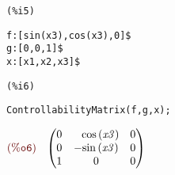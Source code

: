 \noindent
\begin{minipage}[t]{8ex}\color{red}\bf
\begin{verbatim}
(%i5) 
\end{verbatim}
\end{minipage}
\begin{minipage}[t]{\textwidth}\color{blue}
\begin{verbatim}
f:[sin(x3),cos(x3),0]$
g:[0,0,1]$
x:[x1,x2,x3]$
\end{verbatim}
\end{minipage}

\smallskip

\noindent
\begin{minipage}[t]{8ex}\color{red}\bf
\begin{verbatim}
(%i6) 
\end{verbatim}
\end{minipage}
\begin{minipage}[t]{\textwidth}\color{blue}
\begin{verbatim}
ControllabilityMatrix(f,g,x);
\end{verbatim}
\end{minipage}

\noindent
\begin{math}\displaystyle
\parbox{8ex}{$\color{labelcolor}\mathrm{\tt (\%o6) }\quad $}
\begin{pmatrix}0 & \phantom{-}\mathrm{cos}\left( \mathit{x3}\right)  & 0\cr 0 & -\mathrm{sin}\left( \mathit{x3}\right)  & 0\cr 1 & 0 & 0\end{pmatrix}\mbox{}
\end{math}
